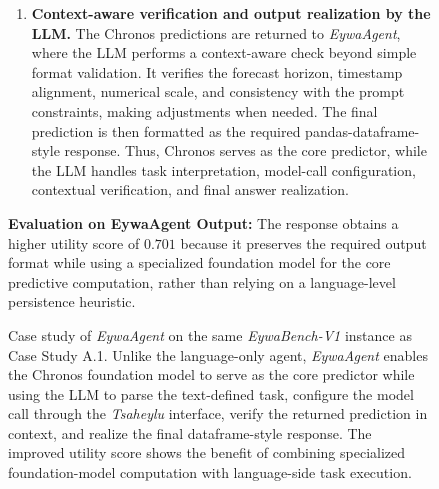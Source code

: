 \documentclass{llmxive}
\begin{document}
{\begin{figure}[!htbp]
{\begin{tcolorbox}
\begin{enumerate}
    \begin{quote}
    \small
    \texttt{timestamp,value}\\
    \textit{(Chronos-generated predictions are aligned with the next 10 timestamps)}\\
    \texttt{\ldots}
    \end{quote}

    \item \textbf{Context-aware verification and output realization by the LLM.}
    The Chronos predictions are returned to \textit{EywaAgent}, where the LLM performs a context-aware check beyond simple format validation. It verifies the forecast horizon, timestamp alignment, numerical scale, and consistency with the prompt constraints, making adjustments when needed. The final prediction is then formatted as the required pandas-dataframe-style response. Thus, Chronos serves as the core predictor, while the LLM handles task interpretation, model-call configuration, contextual verification, and final answer realization.
\end{enumerate}


\textbf{Evaluation on EywaAgent Output:}
The response obtains a higher utility score of $0.701$ because it preserves the required output format while using a specialized foundation model for the core predictive computation, rather than relying on a language-level persistence heuristic.


\end{tcolorbox}}
\caption{
Case study of \textit{EywaAgent} on the same \textit{EywaBench-V1} instance as Case Study A.1. Unlike the language-only agent, \textit{EywaAgent} enables the Chronos foundation model to serve as the core predictor while using the LLM to parse the text-defined task, configure the model call through the \textit{Tsaheylu} interface, verify the returned prediction in context, and realize the final dataframe-style response. The improved utility score shows the benefit of combining specialized foundation-model computation with language-side task execution.
}
\label{fig: case_study_eywaagent}
\end{figure}







\begin{figure}[!htbp]
\centering
\resizebox{\textwidth}{!}{
\begin{tcolorbox}[colback=gray!5!white, colframe=pink!90, 
title=Case Study B.1: EywaOrchestra Example 1, boxrule=0.3mm, width=1.2\textwidth, arc=2mm, auto outer arc=true]


\end{tcolorbox}}
\end{figure}}
\end{document}
